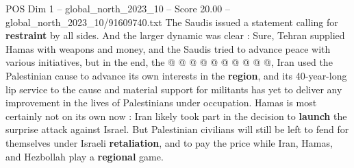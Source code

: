 \begin{textsample}{POS Dim 1 – global\_north\_2023\_10 – Score 20.00 – global\_north\_2023\_10/91609740.txt}
The Saudis issued a statement calling for \textbf{restraint} by all sides.
And the larger dynamic was clear : Sure, Tehran supplied Hamas with weapons and money, and the Saudis tried to advance peace with various initiatives, but in the end, the @ @ @ @ @ @ @ @ @ @, Iran used the Palestinian cause to advance its own interests in the \textbf{region}, and its 40-year-long lip service to the cause and material support for militants has yet to deliver any improvement in the lives of Palestinians under occupation.
Hamas is most certainly not on its own now : Iran likely took part in the decision to \textbf{launch} the surprise attack against Israel.
But Palestinian civilians will still be left to fend for themselves under Israeli \textbf{retaliation}, and to pay the price while Iran, Hamas, and Hezbollah play a \textbf{regional} game.

\end{textsample}

